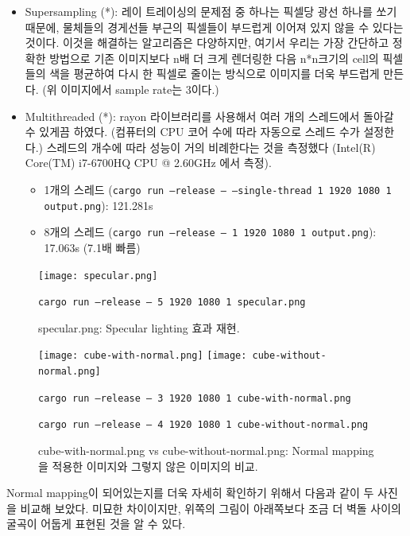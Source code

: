 \documentclass[11pt, a4paper]{article}
\begin{document}
\begin{itemize}
  \item Supersampling (*): 레이 트레이싱의 문제점 중 하나는 픽셀당 광선 하나를 쏘기 때문에, 물체들의 경게선들 부근의 픽셀들이 부드럽게 이어져 있지 않을 수 있다는 것이다. 이것을 해결하는 알고리즘은 다양하지만, 여기서 우리는 가장 간단하고 정확한 방법으로 기존 이미지보다 n배 더 크게 렌더링한 다음 n*n크기의 cell의 픽셀들의 색을 평균하여 다시 한 픽셀로 줄이는 방식으로 이미지를 더욱 부드럽게 만든다. (위 이미지에서 sample rate는 3이다.)
    
  \item Multithreaded (*): rayon 라이브러리를 사용해서 여러 개의 스레드에서 돌아갈 수 있게끔 하였다. (컴퓨터의 CPU 코어 수에 따라 자동으로 스레드 수가 설정한다.) 스레드의 개수에 따라 성능이 거의 비례한다는 것을 측정했다 (Intel(R) Core(TM) i7-6700HQ CPU @ 2.60GHz 에서 측정).
    \begin{itemize}
      \item 1개의 스레드 (\texttt{cargo run --release -- --single-thread 1 1920 1080 1 output.png}): 121.281s
      \item 8개의 스레드 (\texttt{cargo run --release -- 1 1920 1080 1 output.png}): 17.063s (7.1배 빠름)
    \end{itemize}

\end{itemize}


\begin{figure}[H]
  \centering
  \texttt{[image: specular.png]}
  \caption{specular.png: Specular lighting 효과 재현.}
  \texttt{cargo run --release -- 5 1920 1080 1 specular.png}
\end{figure}


\begin{figure}[H]
  \centering
  \texttt{[image: cube-with-normal.png]}
  \texttt{[image: cube-without-normal.png]}
  \caption{cube-with-normal.png vs cube-without-normal.png: Normal mapping을 적용한 이미지와 그렇지 않은 이미지의 비교.}

  \texttt{cargo run --release -- 3 1920 1080 1 cube-with-normal.png}

  \texttt{cargo run --release -- 4 1920 1080 1 cube-without-normal.png}
\end{figure}


Normal mapping이 되어있는지를 더욱 자세히 확인하기 위해서 다음과 같이 두 사진을 비교해 보았다. 미묘한 차이이지만, 위쪽의 그림이 아래쪽보다 조금 더 벽돌 사이의 굴곡이 어둡게 표현된 것을 알 수 있다.
\end{document}
